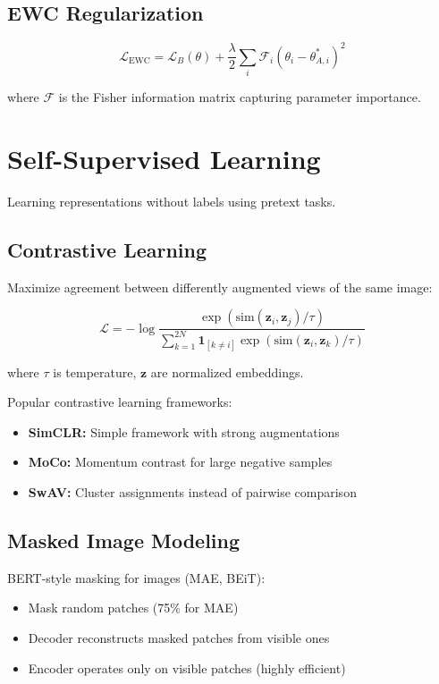 \subsection{EWC Regularization}

\begin{equation}
\mathcal{L}_{\text{EWC}} = \mathcal{L}_B(\theta) + \frac{\lambda}{2}\sum_i \mathcal{F}_i (\theta_i - \theta_{A,i}^*)^2
\end{equation}

where $\mathcal{F}$ is the Fisher information matrix capturing parameter importance.

\section{Self-Supervised Learning}

Learning representations without labels using pretext tasks.

\subsection{Contrastive Learning}

Maximize agreement between differently augmented views of the same image:

\begin{equation}
\mathcal{L} = -\log \frac{\exp(\text{sim}(\mathbf{z}_i, \mathbf{z}_j)/\tau)}{\sum_{k=1}^{2N} \mathbf{1}_{[k \neq i]} \exp(\text{sim}(\mathbf{z}_i, \mathbf{z}_k)/\tau)}
\end{equation}

where $\tau$ is temperature, $\mathbf{z}$ are normalized embeddings.

Popular contrastive learning frameworks:
\begin{itemize}
    \item \textbf{SimCLR:} Simple framework with strong augmentations
    \item \textbf{MoCo:} Momentum contrast for large negative samples
    \item \textbf{SwAV:} Cluster assignments instead of pairwise comparison
\end{itemize}

\subsection{Masked Image Modeling}

BERT-style masking for images (MAE, BEiT):
\begin{itemize}
    \item Mask random patches (75\% for MAE)
    \item Decoder reconstructs masked patches from visible ones
    \item Encoder operates only on visible patches (highly efficient)
\end{itemize}

